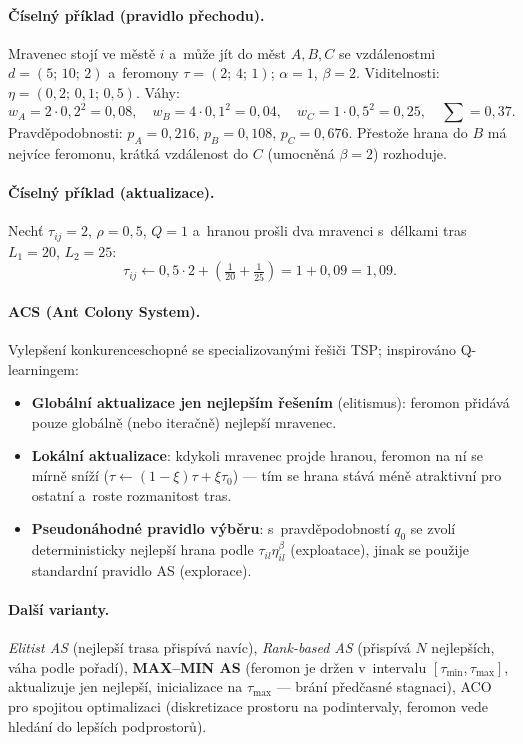 \documentclass[11pt,a4paper]{article}
\theoremstyle{definition}
\begin{document}
\paragraph{Číselný příklad (pravidlo přechodu).} Mravenec stojí ve městě $i$
a~může jít do měst $A, B, C$ se vzdálenostmi $d = (5;\,10;\,2)$
a~feromony $\tau = (2;\,4;\,1)$; $\alpha = 1$, $\beta = 2$.
Viditelnosti: $\eta = (0{,}2;\,0{,}1;\,0{,}5)$. Váhy:
\[
w_A = 2 \cdot 0{,}2^2 = 0{,}08,\quad
w_B = 4 \cdot 0{,}1^2 = 0{,}04,\quad
w_C = 1 \cdot 0{,}5^2 = 0{,}25,\quad \textstyle\sum = 0{,}37 .
\]
Pravděpodobnosti: $p_A = 0{,}216$, $p_B = 0{,}108$, $p_C = 0{,}676$.
Přestože hrana do $B$ má nejvíce feromonu, krátká vzdálenost do $C$ (umocněná
$\beta = 2$) rozhoduje.

\paragraph{Číselný příklad (aktualizace).} Nechť $\tau_{ij} = 2$, $\rho = 0{,}5$,
$Q = 1$ a~hranou prošli dva mravenci s~délkami tras $L_1 = 20$, $L_2 = 25$:
\[
\tau_{ij} \gets 0{,}5 \cdot 2 + \left(\tfrac{1}{20} + \tfrac{1}{25}\right)
= 1 + 0{,}09 = 1{,}09 .
\]

\paragraph{ACS (Ant Colony System).} Vylepšení konkurenceschopné se
specializovanými řešiči TSP; inspirováno Q-learningem:
\begin{itemize}
\item \textbf{Globální aktualizace jen nejlepším řešením} (elitismus): feromon
  přidává pouze globálně (nebo iteračně) nejlepší mravenec.
\item \textbf{Lokální aktualizace}: kdykoli mravenec projde hranou, feromon
  na ní se mírně sníží ($\tau \gets (1-\xi)\tau + \xi\tau_0$) --- tím se hrana
  stává méně atraktivní pro ostatní a~roste rozmanitost tras.
\item \textbf{Pseudonáhodné pravidlo výběru}: s~pravděpodobností $q_0$ se
  zvolí deterministicky nejlepší hrana podle
  $\tau_{il}\eta_{il}^{\beta}$ (exploatace), jinak se použije standardní
  pravidlo AS (explorace).
\end{itemize}

\paragraph{Další varianty.}
\emph{Elitist AS} (nejlepší trasa přispívá navíc),
\emph{Rank-based AS} (přispívá $N$ nejlepších, váha podle pořadí),
\textbf{MAX--MIN AS} (feromon je držen v~intervalu
$[\tau_{\min}, \tau_{\max}]$, aktualizuje jen nejlepší, inicializace na
$\tau_{\max}$ --- brání předčasné stagnaci),
ACO pro spojitou optimalizaci (diskretizace prostoru na podintervaly,
feromon vede hledání do lepších podprostorů).
\end{document}
